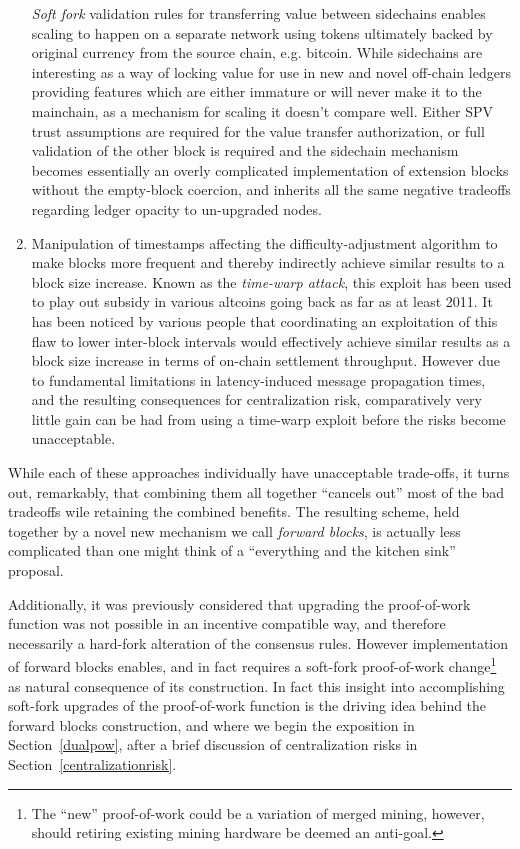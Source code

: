 \begin{enumerate}
    \emph{Soft fork} validation rules for transferring value between
    sidechains enables scaling to happen on a separate network using
    tokens ultimately backed by original currency from the source
    chain, e.g. bitcoin.  While sidechains are interesting as a way of
    locking value for use in new and novel off-chain ledgers providing
    features which are either immature or will never make it to the
    mainchain, as a mechanism for scaling it doesn't compare well.
    Either SPV trust assumptions are required for the value transfer
    authorization, or full validation of the other block is required
    and the sidechain mechanism becomes essentially an overly
    complicated implementation of extension blocks without the
    empty-block coercion, and inherits all the same negative tradeoffs
    regarding ledger opacity to un-upgraded nodes.

  \item

    Manipulation of timestamps affecting the difficulty-adjustment
    algorithm to make blocks more frequent and thereby indirectly
    achieve similar results to a block size increase.  Known as the
    \emph{time-warp attack}, this exploit has been used to play out
    subsidy in various altcoins going back as far as at least 2011.
    It has been noticed by various people that coordinating an
    exploitation of this flaw to lower inter-block intervals would
    effectively achieve similar results as a block size increase in
    terms of on-chain settlement throughput.  However due to
    fundamental limitations in latency-induced message propagation
    times, and the resulting consequences for centralization risk,
    comparatively very little gain can be had from using a time-warp
    exploit before the risks become unacceptable.

\end{enumerate}

While each of these approaches individually have unacceptable
trade-offs, it turns out, remarkably, that combining them all together
``cancels out'' most of the bad tradeoffs wile retaining the combined
benefits.  The resulting scheme, held together by a novel new
mechanism we call \emph{forward blocks}, is actually less complicated
than one might think of a ``everything and the kitchen sink''
proposal.

Additionally, it was previously considered that upgrading the
proof-of-work function was not possible in an incentive compatible
way, and therefore necessarily a hard-fork alteration of the consensus
rules.  However implementation of forward blocks enables, and in fact
requires a soft-fork proof-of-work change\footnote{The ``new''
  proof-of-work could be a variation of merged mining, however, should
  retiring existing mining hardware be deemed an anti-goal.} as
natural consequence of its construction.  In fact this insight into
accomplishing soft-fork upgrades of the proof-of-work function is the
driving idea behind the forward blocks construction, and where we
begin the exposition in Section~\ref{dualpow}, after a brief
discussion of centralization risks in
Section~\ref{centralizationrisk}.

